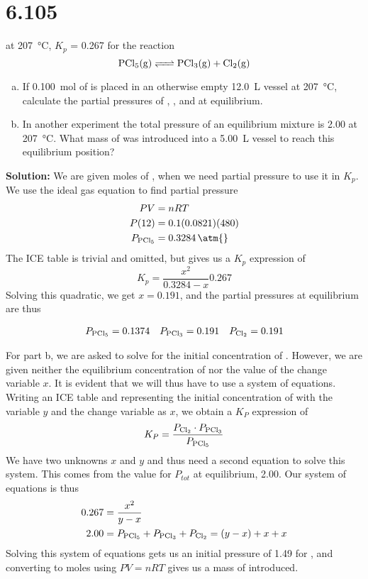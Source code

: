 \documentclass[11 pt]{article}
\begin{document}
    \section*{6.105}
    \begin{problemBox}
        at \SI{207}{\celsius}, $K_p$ = \SI{0.267}{\atm} for the reaction
        $$\ce{PCl5(g) <=> PCl3(g) + Cl2(g)}$$
        \begin{enumerate}[a)]
            \item If \SI{0.100}{\mole} of  is placed in an otherwise empty \SI{12.0}{\liter} vessel at \SI{207}{\celsius}, calculate the partial pressures of , , and  at equilibrium.
            \item In another experiment the total pressure of an equilibrium mixture is \SI{2.00}{\atm{}} at \SI{207}{\celsius}. What mass of  was introduced into a \SI{5.00}{\liter} vessel to reach this equilibrium position?
        \end{enumerate} 
    \end{problemBox}
    \textbf{Solution:} We are given moles of , when we need partial pressure to use it in $K_p$. We use the ideal gas equation to find partial pressure
    \begin{align*}
        PV &= nRT \\
        P(12) &= 0.1(0.0821)(480) \\
        P_{\ce{PCl5}} &= \SI{0.3284}{\atm{}}
    \end{align*}
    The ICE table is trivial and omitted, but gives us a $K_p$ expression of 
    $$K_p = \frac{x^2}{0.3284 - x} 0.267$$
    Solving this quadratic, we get $x = 0.191$, and the partial pressures at equilibrium are thus
    \begin{answerBox}
    \begin{align*}
        P_{\ce{PCl5}} = 0.1374 && P_{\ce{PCl3}} = 0.191 && P_{\ce{Cl2}} = 0.191
    \end{align*}
    \end{answerBox}
    For part b, we are asked to solve for the initial concentration of . However, we are given neither
    the equilibrium concentration of  nor the value of the change variable $x$. It is evident
    that we will thus have to use a system of equations. Writing an ICE table and representing the initial
    concentration of  with the variable $y$ and the change variable as $x$, we obtain a $K_P$ expression of
    $$ K_P = \frac{P_{\ce{Cl2}} \cdot P_{\ce{PCl3}}}{P_{\ce{PCl5}}}$$
    We have two unknowns $x$ and $y$ and thus need a second equation to solve this system. This comes from
    the value for $P_{tot}$ at equilibrium, \SI{2.00}{\atm{}}. Our system of equations is thus
\begin{align*}
  0.267 &= \frac{x^2}{y-x} \\
  2.00 &= P_{\ce{PCl5}} + P_{\ce{PCl3}} + P_{\ce{Cl2}}= (y-x) + x + x 
\end{align*}
Solving this system of equations gets us an initial pressure of \SI{1.49}{\atm{}} for , and converting to moles
using $PV = nRT$ gives us a mass of  introduced. 
\end{document}
